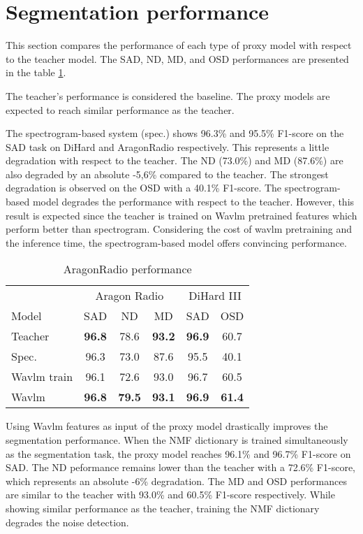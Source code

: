 \section{Segmentation performance}
\label{sect:perf}

This section compares the performance of each type of proxy model with respect to the teacher model.
The SAD, ND, MD, and OSD performances are presented in the table \ref*{tab:seg_results}.

The teacher's performance is considered the baseline.
The proxy models are expected to reach similar performance as the teacher.

The spectrogram-based system (spec.) shows 96.3\% and 95.5\% F1-score on the SAD task on DiHard and AragonRadio respectively.
This represents a little degradation with respect to the teacher.
The ND (73.0\%) and MD (87.6\%) are also degraded by an absolute -5,6\% compared to the teacher.
The strongest degradation is observed on the OSD with a 40.1\% F1-score.
The spectrogram-based model degrades the performance with respect to the teacher.
However, this result is expected since the teacher is trained on Wavlm pretrained features which perform better than spectrogram.
Considering the cost of wavlm pretraining and the inference time, the spectrogram-based model offers convincing performance.

\begin{table}[ht]
    \centering
    \begin{tabular}{lccccc}
        \toprule
         & \multicolumn{3}{c}{Aragon Radio} & \multicolumn{2}{c}{DiHard III} \\
         \cmidrule{2-4}
         \cmidrule{5-6}
         Model & SAD & ND & MD & SAD & OSD \\  
         \midrule
         Teacher & \textbf{96.8} & 78.6 & \textbf{93.2} & \textbf{96.9} & 60.7\\
         \midrule
         Spec. & 96.3 & 73.0 &  87.6 & 95.5 & 40.1\\
         Wavlm train & 96.1 & 72.6 & 93.0 & 96.7 & 60.5\\
         Wavlm & \textbf{96.8} & \textbf{79.5} & \textbf{93.1} & \textbf{96.9} & \textbf{61.4} \\
         \bottomrule
    \end{tabular}
    \caption{AragonRadio performance}
    \label{tab:seg_results}
\end{table}

Using Wavlm features as input of the proxy model drastically improves the segmentation performance.
When the NMF dictionary is trained simultaneously as the segmentation task, the proxy model reaches 96.1\% and 96.7\% F1-score on SAD.
The ND peformance remains lower than the teacher with a 72.6\% F1-score, which represents an absolute -6\% degradation.
The MD and OSD performances are similar to the teacher with 93.0\% and 60.5\% F1-score respectively.
While showing similar performance as the teacher, training the NMF dictionary degrades the noise detection.

